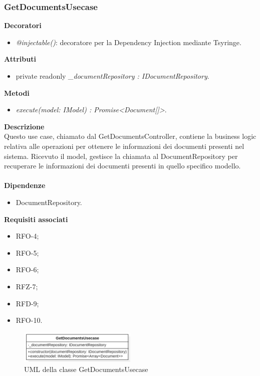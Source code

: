 \subsubsection{GetDocumentsUsecase}
\textbf{Decoratori}
\begin{itemize}
    \item \textit{@injectable()}: decoratore per la Dependency Injection mediante Tsyringe.
\end{itemize}
\textbf{Attributi}
\begin{itemize}[itemsep=-4pt]
    \item private readonly \textit{\_documentRepository : IDocumentRepository}.
\end{itemize}
\textbf{Metodi}
\begin{itemize}
    \item \textit{execute(model: IModel) : Promise<Document[]>}.
\end{itemize}
\textbf{Descrizione}\\
Questo use case, chiamato dal GetDocumentsController, contiene la business logic relativa alle operazioni per ottenere le informazioni dei documenti presenti nel sistema. Ricevuto il model, gestisce la chiamata al DocumentRepository per recuperare le informazioni dei documenti presenti in quello specifico modello.\\ \\
\textbf{Dipendenze}
\begin{itemize}
    \item DocumentRepository.
\end{itemize}
\textbf{Requisiti associati}
\begin{itemize}[itemsep=-4pt]
    \item RFO-4;
    \item RFO-5;
    \item RFO-6;
    \item RFZ-7;
    \item RFD-9;
    \item RFO-10.
\end{itemize}

\begin{figure}[h!]
    \centering  
    \includegraphics[width=0.5\textwidth]{GetDocumentsUsecase.png}
    \caption{UML della classe GetDocumentsUsecase}
\end{figure}

